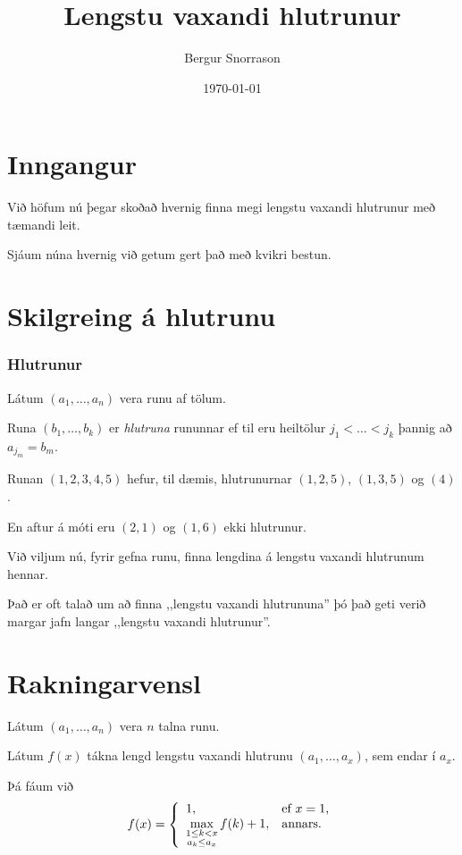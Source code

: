 \title{Lengstu vaxandi hlutrunur}
\author{Bergur Snorrason}
\date{\today}



\frame{\titlepage}

\section{Inngangur}
{
    {
        \item<1-> Við höfum nú þegar skoðað hvernig finna megi lengstu vaxandi hlutrunur með tæmandi leit.
        \item<2-> Sjáum núna hvernig við getum gert það með kvikri bestun.
    }
}

\section{Skilgreing á hlutrunu}
{
    \frametitle{Hlutrunur}
    {
        \item<1-> Látum $(a_1, \dots, a_n)$ vera runu af tölum.
        \item<2-> Runa $(b_1, \dots, b_k)$ er \emph{hlutruna} rununnar ef til eru heiltölur $j_1 < \dots < j_k$ þannig að $a_{j_m} = b_m$.
        \item<3-> Runan $(1, 2, 3, 4, 5)$ hefur, til dæmis, hlutrunurnar $(1, 2, 5)$, $(1, 3, 5)$ og $(4)$.
        \item<4-> En aftur á móti eru $(2, 1)$ og $(1, 6)$ ekki hlutrunur.
        \item<5-> Við viljum nú, fyrir gefna runu, finna lengdina á lengstu vaxandi hlutrunum hennar.
        \item<6-> Það er oft talað um að finna ,,lengstu vaxandi hlutrununa'' þó það geti verið margar jafn langar ,,lengstu vaxandi hlutrunur''.
    }
}

\section{Rakningarvensl}
{
    {
        \item<1-> Látum $(a_1, \dots, a_n)$ vera $n$ talna runu.
        \item<2-> Látum $f(x)$ tákna lengd lengstu vaxandi hlutrunu $(a_1, \dots, a_x)$, sem endar í $a_x$.
        \item<3-> Þá fáum við
        \[
            f(x) = \left \{
            \env{array}
            { {l l}
                1, & \text{ef $x = 1$,} \\
                \displaystyle \max_{\substack{1 \leq k < x\\a_k \leq a_x}} f(k) + 1, & \text{annars.}
            }
            \right .
        \]
    }
}

